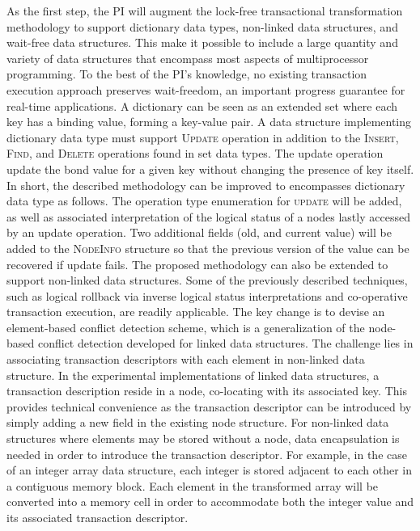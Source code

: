 \documentclass{article}
\begin{document}
As the first step, the PI will augment the lock-free transactional transformation methodology to support dictionary data types, non-linked data structures, and wait-free data structures.
This make it possible to include a large quantity and variety of data structures that encompass most aspects of multiprocessor programming.
To the best of the PI's knowledge, no existing transaction execution approach preserves wait-freedom, an important progress guarantee for real-time applications.
A dictionary can be seen as an extended set where each key has a binding value, forming a key-value pair.
A data structure implementing dictionary data type must support \textsc{Update} operation in addition to the \textsc{Insert}, \textsc{Find}, and \textsc{Delete} operations found in set data types.
The update operation update the bond value for a given key without changing the presence of key itself.
In short, the described methodology can be improved to encompasses dictionary data type as follows.
The operation type enumeration for \textsc{update} will be added, as well as associated interpretation of the logical status of a nodes lastly accessed by an update operation.
Two additional fields (old, and current value) will be added to the \textsc{NodeInfo} structure so that the previous version of the value can be recovered if update fails.
The proposed methodology can also be extended to support non-linked data structures.
Some of the previously described techniques, such as logical rollback via inverse logical status interpretations and co-operative transaction execution, are readily applicable.
The key change is to devise an element-based conflict detection scheme, which is a generalization of the node-based conflict detection developed for linked data structures. 
The challenge lies in associating transaction descriptors with each element in non-linked data structure.
In the experimental implementations of linked data structures, a transaction description reside in a node, co-locating with its associated key.
This provides technical convenience as the transaction descriptor can be introduced by simply adding a new field in the existing node structure.
For non-linked data structures where elements may be stored without a node, data encapsulation is needed in order to introduce the transaction descriptor.
For example, in the case of an integer array data structure, each integer is stored adjacent to each other in a contiguous memory block.
Each element in the transformed array will be converted into a memory cell in order to accommodate both the integer value and its associated transaction descriptor.
\end{document}
